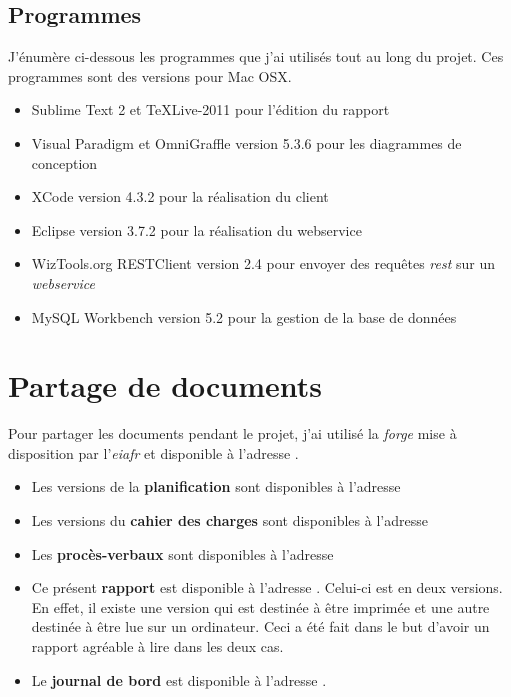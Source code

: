 \subsection{Programmes} %
\label{sub:programmes}
J'énumère ci-dessous les programmes que j'ai utilisés tout au long du projet. Ces programmes sont des versions pour Mac OSX.

\medskip

\begin{itemize}
	\item Sublime Text 2 et TeXLive-2011 pour l'édition du rapport
	\item Visual Paradigm et OmniGraffle version 5.3.6 pour les diagrammes de conception
	\item XCode version 4.3.2 pour la réalisation du client
	\item Eclipse version 3.7.2 pour la réalisation du webservice
	\item WizTools.org RESTClient version 2.4 pour envoyer des requêtes \emph{\gls{rest}} sur un \emph{\gls{webservice}}
	\item MySQL Workbench version 5.2 pour la gestion de la base de données
\end{itemize}




\section{Partage de documents} %
\label{sec:partage_de_documents}

Pour partager les documents pendant le projet, j'ai utilisé la \emph{\gls{forge}} mise à disposition par l'\emph{\gls{eiafr}} et disponible à l'adresse \cite{online:forge}.

\medskip

\begin{itemize}
	\item Les versions de la \textbf{planification} sont disponibles à l'adresse \cite{online:forge:plan}
	\item Les versions du \textbf{cahier des charges} sont disponibles à l'adresse \cite{online:forge:spec}
	\item Les \textbf{procès-verbaux} sont disponibles à l'adresse \cite{online:forge:pv}
	\item Ce présent \textbf{rapport} est disponible à l'adresse \cite{online:forge:rapport}. Celui-ci est en deux versions. En effet, il existe une version qui est destinée à être imprimée et une autre destinée à être lue sur un ordinateur. Ceci a été fait dans le but d'avoir un rapport agréable à lire dans les deux cas.
	\item Le \textbf{journal de bord} est disponible à l'adresse \cite{online:forge:wiki}.
\end{itemize}

